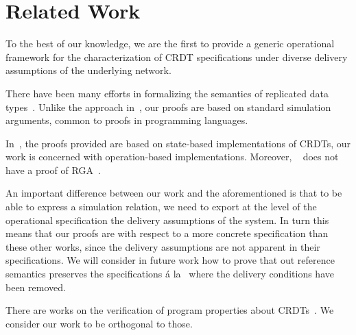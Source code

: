 \section{Related Work}
\label{sec:related-work}

To the best of our knowledge, we are the first to provide a generic
operational framework for the characterization of CRDT specifications
under diverse delivery assumptions of the underlying network.
%

There have been many efforts in formalizing the semantics of
replicated data types~\cite{Burckhardt:2014,Burckhardt:2014b,ZellerBP14}.
%
Unlike the approach in~\cite{Burckhardt:2014,Burckhardt:2014b}, our
proofs are based on standard simulation arguments, common to proofs in
programming languages.
%

In~\cite{ZellerBP14}, the proofs provided are based on state-based
implementations of CRDTs, our work is concerned with operation-based
implementations.
%
Moreover, ~\cite{ZellerBP14} does not have a proof of RGA~\cite{RohJKL11}.

An important difference between our work and the aforementioned is
that to be able to express a simulation relation, we need to export at
the level of the operational specification the delivery assumptions of
the system.
%
In turn this means that our proofs are with respect to a more concrete
specification than these other works, since the delivery assumptions
are not apparent in their specifications.
%
We will consider in future work how to prove that out reference
semantics preserves the specifications \'a la~\cite{Burckhardt:2014}
where the delivery conditions have been removed.
%

There are works on the verification of program properties about
CRDTs~\cite{GotsmanYFNS16}.
%
We consider our work to be orthogonal to
those.

